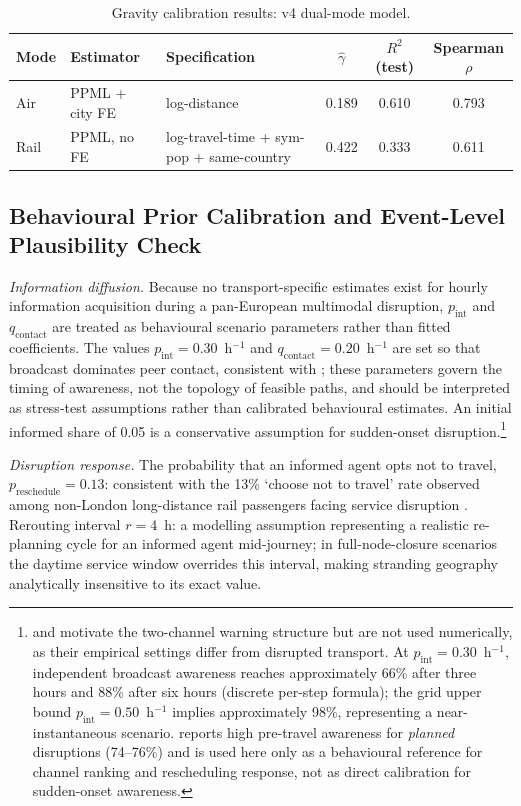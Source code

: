 \documentclass[12pt,a4paper]{article}
\begin{document}
\begin{table}[h]
\centering
\caption{Gravity calibration results: v4 dual-mode model.}
\label{tab:gravity}
\small
\begin{tabular}{lllccc}
\toprule
Mode & Estimator & Specification & $\hat{\gamma}$ & $R^2$ (test) & Spearman $\rho$ \\
\midrule
Air  & PPML + city FE & log-distance
     & 0.189 & 0.610 & 0.793 \\
Rail & PPML, no FE    & log-travel-time + sym-pop + same-country
     & 0.422 & 0.333 & 0.611 \\
\bottomrule
\end{tabular}
\end{table}

\subsection{Behavioural Prior Calibration and Event-Level Plausibility Check}
\label{sec:layer_e}

\emph{Information diffusion.}
Because no transport-specific estimates exist for hourly information acquisition during a pan-European multimodal disruption, $p_{\text{int}}$ and $q_{\text{contact}}$ are treated as behavioural scenario parameters rather than fitted coefficients.
The values $p_{\text{int}} = 0.30$~h$^{-1}$ and $q_{\text{contact}} = 0.20$~h$^{-1}$ are set so that broadcast dominates peer contact, consistent with \citet{ORRAECOM2017}; these parameters govern the timing of awareness, not the topology of feasible paths, and should be interpreted as stress-test assumptions rather than calibrated behavioural estimates.
An initial informed share of 0.05 is a conservative assumption for sudden-onset disruption.\footnote{\citet{DArienzo2020} and \citet{OShea2020} motivate the two-channel warning structure but are not used numerically, as their empirical settings differ from disrupted transport. At $p_{\text{int}} = 0.30$~h$^{-1}$, independent broadcast awareness reaches approximately 66\% after three hours and 88\% after six hours (discrete per-step formula); the grid upper bound $p_{\text{int}} = 0.50$~h$^{-1}$ implies approximately 98\%, representing a near-instantaneous scenario. \citet{ORRAECOM2017} reports high pre-travel awareness for \emph{planned} disruptions (74--76\%) and is used here only as a behavioural reference for channel ranking and rescheduling response, not as direct calibration for sudden-onset awareness.}

\emph{Disruption response.}
The probability that an informed agent opts not to travel, $p_{\text{reschedule}} = 0.13$: consistent with the 13\%
`choose not to travel' rate observed among non-London long-distance rail passengers
facing service disruption \citep[Table~3.4]{ORRAECOM2017}.
Rerouting interval $r = 4$~h: a modelling assumption representing a realistic re-planning
cycle for an informed agent mid-journey; in full-node-closure scenarios the daytime service
window overrides this interval, making stranding geography analytically insensitive to its exact value.
\end{document}

